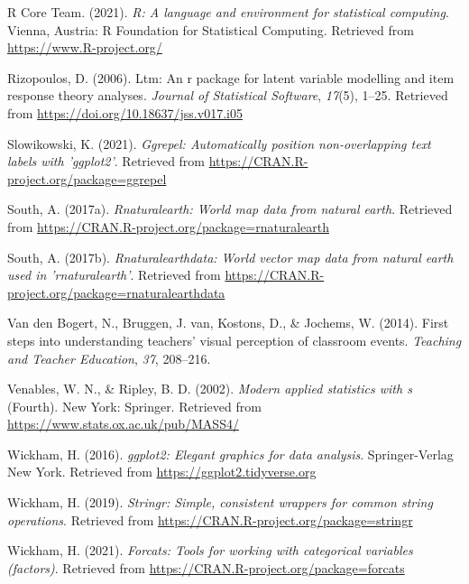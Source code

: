 \documentclass[
  man]{apa6}
\newlength{\cslhangindent}
\newlength{\cslentryspacingunit} %
\newenvironment{CSLReferences}[2] %
 {%
  \setlength{\parindent}{0pt}
  \ifodd #1
  \let\oldpar\par
  \def\par{\hangindent=\cslhangindent\oldpar}
  \fi
  \setlength{\parskip}{#2\cslentryspacingunit}
 }%
 {}
\begin{document}
\begin{CSLReferences}{1}{0}
\leavevmode{}%
R Core Team. (2021). \emph{R: A language and environment for statistical computing}. Vienna, Austria: R Foundation for Statistical Computing. Retrieved from \url{https://www.R-project.org/}

\leavevmode{}%
Rizopoulos, D. (2006). Ltm: An r package for latent variable modelling and item response theory analyses. \emph{Journal of Statistical Software}, \emph{17}(5), 1--25. Retrieved from \url{https://doi.org/10.18637/jss.v017.i05}

\leavevmode{}%
Slowikowski, K. (2021). \emph{Ggrepel: Automatically position non-overlapping text labels with 'ggplot2'}. Retrieved from \url{https://CRAN.R-project.org/package=ggrepel}

\leavevmode{}%
South, A. (2017a). \emph{Rnaturalearth: World map data from natural earth}. Retrieved from \url{https://CRAN.R-project.org/package=rnaturalearth}

\leavevmode{}%
South, A. (2017b). \emph{Rnaturalearthdata: World vector map data from natural earth used in 'rnaturalearth'}. Retrieved from \url{https://CRAN.R-project.org/package=rnaturalearthdata}

\leavevmode{}%
Van den Bogert, N., Bruggen, J. van, Kostons, D., \& Jochems, W. (2014). First steps into understanding teachers' visual perception of classroom events. \emph{Teaching and Teacher Education}, \emph{37}, 208--216.

\leavevmode{}%
Venables, W. N., \& Ripley, B. D. (2002). \emph{Modern applied statistics with s} (Fourth). New York: Springer. Retrieved from \url{https://www.stats.ox.ac.uk/pub/MASS4/}

\leavevmode{}%
Wickham, H. (2016). \emph{ggplot2: Elegant graphics for data analysis}. Springer-Verlag New York. Retrieved from \url{https://ggplot2.tidyverse.org}

\leavevmode{}%
Wickham, H. (2019). \emph{Stringr: Simple, consistent wrappers for common string operations}. Retrieved from \url{https://CRAN.R-project.org/package=stringr}

\leavevmode{}%
Wickham, H. (2021). \emph{Forcats: Tools for working with categorical variables (factors)}. Retrieved from \url{https://CRAN.R-project.org/package=forcats}


\end{CSLReferences}
\end{document}
